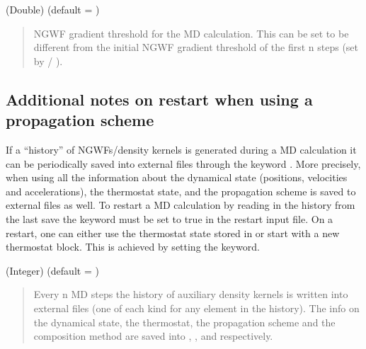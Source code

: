 \documentclass[letterpaper,10pt,english]{sphinxmanual}
\begin{document}
 (Double) (default = )
\begin{quote}

\begin{DUlineblock}{0em}
\item[] NGWF gradient threshold for the MD calculation. This can be set to be different from the initial NGWF gradient threshold  of the first n steps (set by  / ).
\end{DUlineblock}
\end{quote}


\subsection{Additional notes on restart when using a propagation scheme}
\label{\detokenize{BOMD:additional-notes-on-restart-when-using-a-propagation-scheme}}
If a
“history” of NGWFs/density kernels is generated during a MD calculation
it can be periodically saved into external files through the keyword
. More precisely, when using
 all the information about the dynamical state
(positions, velocities and accelerations), the thermostat state, and the
propagation scheme is saved to external files as well. To restart a MD
calculation by reading in the history from the last save the
 keyword must be set to true in the restart input
file. On a restart, one can either use the thermostat state stored in
 or start with a new thermostat block.
This is achieved by setting the  keyword.

 (Integer) (default = )
\begin{quote}

\begin{DUlineblock}{0em}
\item[] Every n MD steps the history of auxiliary density kernels is written into external files  (one of each kind for any element in the history). The info on the dynamical state, the thermostat, the propagation scheme and the composition method are saved into , ,  and  respectively.
\end{DUlineblock}
\end{quote}
\end{document}
